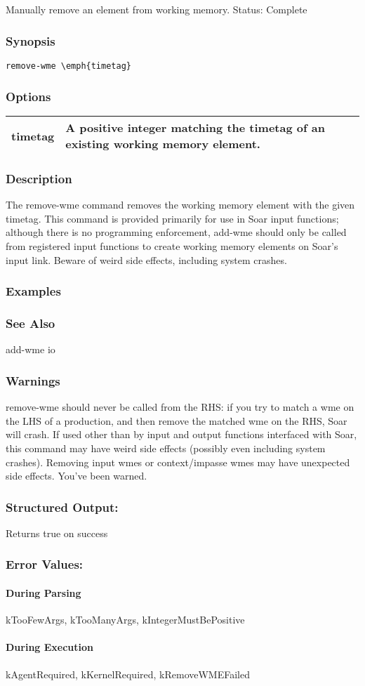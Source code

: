 \subsection{}
\label{remove-wme}
Manually remove an element from working memory. 
 Status: Complete
\subsubsection*{Synopsis}
\begin{verbatim}
remove-wme \emph{timetag}
\end{verbatim}
\subsubsection*{Options}
\begin{tabular}{|l|l|}
\hline 
 timetag  & A positive integer matching the timetag of an existing working memory element.  \\
 \hline 
\end{tabular}
\subsubsection*{Description}
 The remove-wme command removes the working memory element with the given timetag. This command is provided primarily for use in Soar input functions; although there is no programming enforcement, add-wme should only be called from registered input functions to create working memory elements on Soar's input link. 
 Beware of weird side effects, including system crashes. 
\subsubsection*{Examples}
\subsubsection*{See Also}
 add-wme io
\subsubsection*{Warnings}
 remove-wme should never be called from the RHS: if you try to match a wme on the LHS of a production, and then remove the matched wme on the RHS, Soar will crash. 
 If used other than by input and output functions interfaced with Soar, this command may have weird side effects (possibly even including system crashes). Removing input wmes or context/impasse wmes may have unexpected side effects. You've been warned. 
\subsubsection*{Structured Output:}
 Returns true on success 
\subsubsection*{Error Values:}
\paragraph*{During Parsing}
 kTooFewArgs, kTooManyArgs, kIntegerMustBePositive
\paragraph*{During Execution}
 kAgentRequired, kKernelRequired, kRemoveWMEFailed
